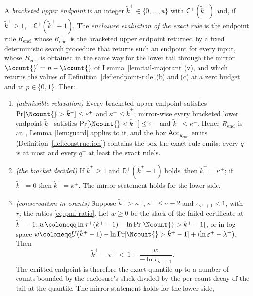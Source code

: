 \begin{proposition}
A \emph{bracketed upper endpoint} is an integer $\tilde k^{+}\in\{0,\dots,n\}$
with $\mathsf{C}^{+}(\tilde k^{+})$ and, if $\tilde k^{+}\ge1$,
$\lnot\mathsf{C}^{+}(\tilde k^{+}-1)$. The \emph{enclosure evaluation of the
exact rule} is the endpoint rule
$R_{\mathrm{encl}}$ whose $R^{+}_{\mathrm{encl}}$ is the bracketed upper
endpoint returned by a fixed deterministic search procedure that returns such
an endpoint for every input, whose $R^{-}_{\mathrm{encl}}$
is obtained in the same way for the lower tail through the mirror
$\Ncount{}'=n-\Ncount{}$ of Lemma~\ref{lem:tail-majorant}\,(v), and which
returns the values of Definition~\ref{def:endpoint-rule}\,(b) and (c) at a
zero budget and at $p\in\{0,1\}$. Then:
\begin{enumerate}[label=(\roman*),leftmargin=2.2em]
\item \emph{(admissible relaxation)} Every bracketed upper endpoint satisfies
$\Pr[\Ncount{}>\tilde k^{+}]\le\varepsilon^{+}$ and
$\kappa^{+}\le\tilde k^{+}$; mirror-wise every bracketed lower endpoint
$\tilde k^{-}$ satisfies $\Pr[\Ncount{}<\tilde k^{-}]\le\varepsilon^{-}$ and
$\tilde k^{-}\le\kappa^{-}$. Hence $R_{\mathrm{encl}}$ is an
, Lemma~\ref{lem:guard} applies to it, and the
box
$\mathsf{Acc}_{R_{\mathrm{encl}}}$ emits (Definition~\ref{def:construction})
contains the box the exact rule emits: every $q^{-}$ is at most and every
$q^{+}$ at least the exact rule's.
\item \emph{(the bracket decided)} If $\tilde k^{+}\ge1$ and
$\mathsf{D}^{+}(\tilde k^{+}-1)$ holds, then $\tilde k^{+}=\kappa^{+}$; if
$\tilde k^{+}=0$ then $\tilde k^{+}=\kappa^{+}$. The mirror statement holds
for the lower side.
\item \emph{(conservatism in counts)} Suppose $\tilde k^{+}>\kappa^{+}$,
$\kappa^{+}\le n-2$ and $r_{\kappa^{+}+1}<1$, with $r_j$ the ratios
\eqref{eq:pmf-ratio}. Let $w\ge0$
be the slack of the failed certificate at $\tilde k^{+}-1$:
$w\coloneqq\ln\tau^{+}(\tilde k^{+}-1)-\ln\Pr[\Ncount{}>\tilde k^{+}-1]$, or
in log space
$w\coloneqq U(\tilde k^{+}-1)-\ln\Pr[\Ncount{}>\tilde k^{+}-1]
+(\ln\varepsilon^{+}-\lambda^{-})$. Then
\begin{equation}\label{eq:bracket-conservatism}
  \tilde k^{+}-\kappa^{+}\ <\ 1+\frac{w}{-\ln r_{\kappa^{+}+1}} .
\end{equation}
The emitted endpoint is therefore the exact quantile up to a number of
counts bounded by the enclosure's slack divided by the per-count decay of
the tail at the quantile. The mirror statement holds for the lower side,

\end{enumerate}
\end{proposition}
